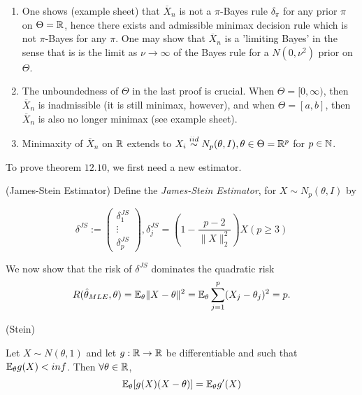 \documentclass[a4paper]{article}
\begin{document}
\begin{remark}
	\begin{enumerate}[label=\roman*)]
		\item One shows (example sheet) that $\overline{X}_n$ is not a $\pi$-Bayes rule $\delta_{\pi}$ for any prior $\pi$ on $\Theta = \mathbb{R}$, hence there exists and admissible minimax decision rule which is not $\pi$-Bayes for any $\pi$. One may show that $\overline{X}_n$ is a 'limiting Bayes' in the sense that is is the limit as $\nu \to \infty$ of the Bayes rule for a $N(0, \nu^2)$ prior on $\Theta$.
		\item The unboundedness of $\Theta$ in the last proof is crucial. When  $\Theta = [0,\infty)$, then $\overline{X}_n$ is inadmissible (it is still minimax, however), and when $\Theta = [a,b]$, then $\overline{X}_n$ is also no longer minimax (see example sheet).
		\item Minimaxity of $\overline{X}_n$ on $\mathbb{R}$ extends to $X_i \stackrel{iid}{\sim} N_p(\theta, I), \theta\in \Theta = \mathbb{R}^{p}$ for $p \in \mathbb{N}$.
		
	\end{enumerate}
\end{remark}

To prove theorem $12.10$, we first need a new estimator.

\begin{defn} (James-Stein Estimator)
	Define the \textit{James-Stein Estimator}, for $X \sim N_p(\theta, I)$ by

	 \[
		 \delta^{JS} := \begin{pmatrix} \delta_1^{JS} \\ \vdots \\ \delta_p^{JS} \end{pmatrix}, \delta_j^{JS} = \left(1 - \frac{p-2}{\|X\|_2^2}\right) X (p\ge 3)
	\] 
\end{defn}

We now show that the risk of $\delta^{JS}$ dominates the quadratic risk
\[
	R(\hat{\theta}_{MLE}, \theta) = \mathbb{E}_{\theta} \|X - \theta\|^2 = \mathbb{E}_{\theta} \sum_{j=1}^{p}(X_j - \theta_j)^2 = p
.\] 

\newpage

\begin{lemma} (Stein)

	Let $X \sim N(\theta, 1)$ and let $g: \mathbb{R} \to \mathbb{R}$ be differentiable and such that $\mathbb{E}_{\theta} g(X) < inf$. Then $\forall \theta \in \mathbb{R}$,
	\[
		\mathbb{E}_{\theta} [g(X)(X-\theta)] = \mathbb{E}_{\theta} g'(X)
	\] 
	
\end{lemma}
\end{document}
